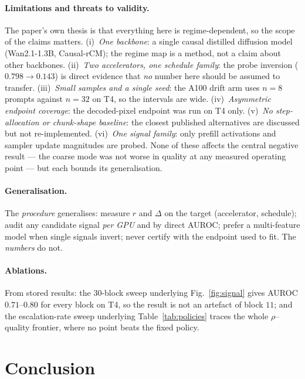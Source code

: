 \documentclass[review]{cas-sc}          %
\begin{document}
\paragraph{Limitations and threats to validity.}
The paper's own thesis is that everything here is regime-dependent, so the scope of the claims matters.
(i)~\emph{One backbone}: a single causal distilled diffusion model (Wan2.1-1.3B, Causal-rCM); the regime
map is a method, not a claim about other backbones.
(ii)~\emph{Two accelerators, one schedule family}: the probe inversion
($0.798 \rightarrow 0.143$) is direct evidence that \emph{no} number here should be assumed to transfer.
(iii)~\emph{Small samples and a single seed}: the A100 drift arm uses $n = 8$ prompts against $n = 32$ on
T4, so the intervals are wide.
(iv)~\emph{Asymmetric endpoint coverage}: the decoded-pixel endpoint was run on T4 only.
(v)~\emph{No step-allocation or chunk-shape baseline}: the closest published alternatives are discussed
but not re-implemented.
(vi)~\emph{One signal family}: only prefill activations and sampler update magnitudes are probed. None of
these affects the central negative result --- the coarse mode was not worse in quality at any measured
operating point --- but each bounds its generalisation.

\paragraph{Generalisation.}
The \emph{procedure} generalises: measure $r$ and $\Delta$ on the target (accelerator, schedule); audit
any candidate signal \emph{per GPU} and by direct AUROC; prefer a multi-feature model when single signals
invert; never certify with the endpoint used to fit. The \emph{numbers} do not.

\paragraph{Ablations.}
From stored results: the 30-block sweep underlying Fig.~\ref{fig:signal} gives AUROC $0.71$--$0.80$ for
every block on T4, so the result is not an artefact of block $11$; and the escalation-rate sweep
underlying Table~\ref{tab:policies} traces the whole $\rho$--quality frontier, where no point beats the
fixed policy.

\section{Conclusion}
\label{sec:conclusion}
\end{document}

